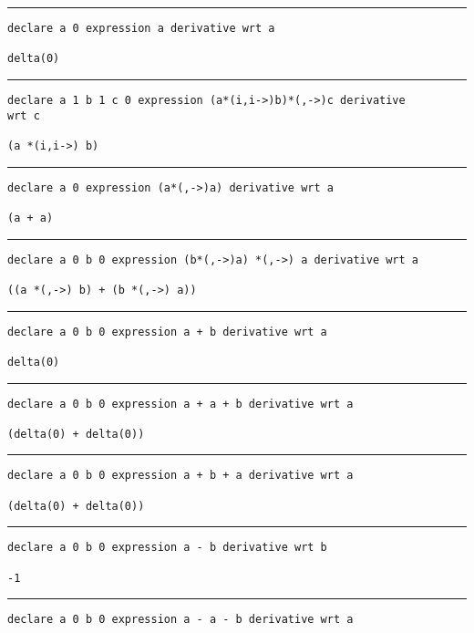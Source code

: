 \documentclass[12pt, a4paper]{report} %
\begin{document}
\rule[0pt]{\textwidth}{0.4pt}
\begin{multicols}{2}
    \tiny
\begin{verbatim}
declare a 0 expression a derivative wrt a

delta(0)
\end{verbatim}
\vspace{-20pt} \rule[-10pt]{\columnwidth}{0.1pt} 
\begin{verbatim}
declare a 1 b 1 c 0 expression (a*(i,i->)b)*(,->)c derivative 
wrt c

(a *(i,i->) b)
\end{verbatim}
\vspace{-20pt} \rule[-10pt]{\columnwidth}{0.1pt} 
\begin{verbatim}
declare a 0 expression (a*(,->)a) derivative wrt a

(a + a)
\end{verbatim}
\vspace{-20pt} \rule[-10pt]{\columnwidth}{0.1pt} 
\begin{verbatim}
declare a 0 b 0 expression (b*(,->)a) *(,->) a derivative wrt a

((a *(,->) b) + (b *(,->) a))
\end{verbatim}
\vspace{-20pt} \rule[-10pt]{\columnwidth}{0.1pt} 
\begin{verbatim}
declare a 0 b 0 expression a + b derivative wrt a

delta(0)
\end{verbatim}
\vspace{-20pt} \rule[-10pt]{\columnwidth}{0.1pt} 
\begin{verbatim}
declare a 0 b 0 expression a + a + b derivative wrt a

(delta(0) + delta(0))
\end{verbatim}
\vspace{-20pt} \rule[-10pt]{\columnwidth}{0.1pt} 
\begin{verbatim}
declare a 0 b 0 expression a + b + a derivative wrt a

(delta(0) + delta(0))
\end{verbatim}
\vspace{-20pt} \rule[-10pt]{\columnwidth}{0.1pt} 
\begin{verbatim}
declare a 0 b 0 expression a - b derivative wrt b

-1
\end{verbatim}
\vspace{-20pt} \rule[-10pt]{\columnwidth}{0.1pt} 
\begin{verbatim}
declare a 0 b 0 expression a - a - b derivative wrt a


\end{verbatim}
\end{multicols}
\end{document}
